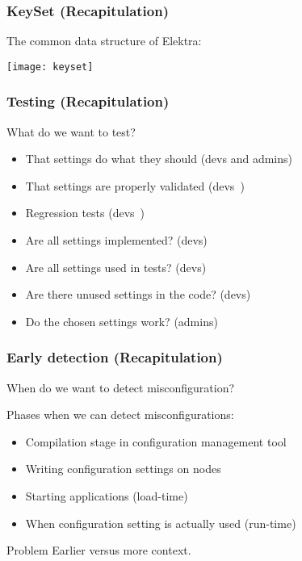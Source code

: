 \begin{frame}
	\frametitle{KeySet (Recapitulation)}

	The common data structure of Elektra:
	\vspace{1cm}

	\texttt{[image: keyset]}
\end{frame}

\begin{frame}
	\frametitle{Testing (Recapitulation)}
	\begin{task}
	What do we want to test?
	\end{task}

	\pause

	\begin{itemize}
	\item That settings do what they should (devs and admins)
	\item That settings are properly validated (devs~\cite{xu2013blame})
	\item Regression tests (devs~\cite{qu2008configuration})
	\vspace{1em}
	\item Are all settings implemented? (devs)
	\item Are all settings used in tests? (devs)
	\item Are there unused settings in the code? (devs)
	\item Do the chosen settings work? (admins)
	\end{itemize}
\end{frame}

\begin{frame}
	\frametitle{Early detection (Recapitulation)}
	\begin{task}
	When do we want to detect misconfiguration?
	\end{task}

	\pause

	Phases when we can detect misconfigurations:
	\begin{itemize} %
	\item Compilation stage in configuration management tool
	\item Writing configuration settings on nodes
	\item Starting applications (load-time)
	\item When configuration setting is actually used (run-time)
	\end{itemize}

	\pause[\thebeamerpauses]

	\begin{alertblock}{Problem}
	Earlier versus more context.
	\end{alertblock}
\end{frame}

